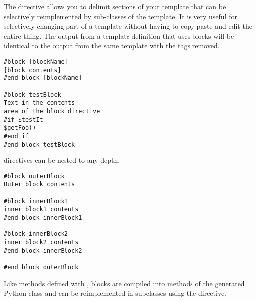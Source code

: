 The  directive allows you to delimit sections of your template
that can be selectively reimplemented by sub-classes of the template.  It is
very useful for selectively changing part of a template without having to
copy-paste-and-edit the entire thing.  The output from a template definition
that uses blocks will be identical to the output from the same template with the 
 tags removed. 

\begin{verbatim}
#block [blockName] 
[block contents] 
#end block [blockName]

#block testBlock
Text in the contents 
area of the block directive
#if $testIt
$getFoo() 
#end if
#end block testBlock
\end{verbatim}

 directives can be nested to any depth.

\begin{verbatim}
#block outerBlock
Outer block contents 

#block innerBlock1
inner block1 contents 
#end block innerBlock1

#block innerBlock2
inner block2 contents 
#end block innerBlock2

#end block outerBlock
\end{verbatim}

Like methods defined with , blocks are compiled into methods of the
generated Python class and can be reimplemented in subclasses using the
 directive.

